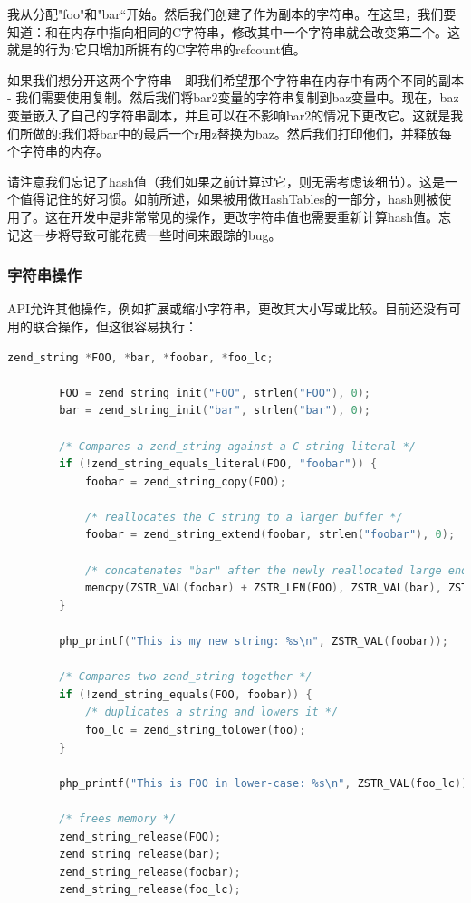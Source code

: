 我从分配"foo"和"bar“开始。然后我们创建了作为副本的字符串。在这里，我们要知道：和在内存中指向相同的C字符串，修改其中一个字符串就会改变第二个。这就是的行为:它只增加所拥有的C字符串的refcount值。

如果我们想分开这两个字符串 - 即我们希望那个字符串在内存中有两个不同的副本 - 我们需要使用复制。然后我们将bar2变量的字符串复制到baz变量中。现在，baz变量嵌入了自己的字符串副本，并且可以在不影响bar2的情况下更改它。这就是我们所做的:我们将bar中的最后一个r用z替换为baz。然后我们打印他们，并释放每个字符串的内存。

请注意我们忘记了hash值（我们如果之前计算过它，则无需考虑该细节）。这是一个值得记住的好习惯。如前所述，如果被用做HashTables的一部分，hash则被使用了。这在开发中是非常常见的操作，更改字符串值也需要重新计算hash值。忘记这一步将导致可能花费一些时间来跟踪的bug。

\subsubsection{字符串操作}

 API允许其他操作，例如扩展或缩小字符串，更改其大小写或比较。目前还没有可用的联合操作，但这很容易执行：

\begin{lstlisting}[language=c]
        zend_string *FOO, *bar, *foobar, *foo_lc;

        FOO = zend_string_init("FOO", strlen("FOO"), 0);
        bar = zend_string_init("bar", strlen("bar"), 0);
        
        /* Compares a zend_string against a C string literal */
        if (!zend_string_equals_literal(FOO, "foobar")) {
            foobar = zend_string_copy(FOO);
        
            /* reallocates the C string to a larger buffer */
            foobar = zend_string_extend(foobar, strlen("foobar"), 0);
        
            /* concatenates "bar" after the newly reallocated large enough "FOO" */
            memcpy(ZSTR_VAL(foobar) + ZSTR_LEN(FOO), ZSTR_VAL(bar), ZSTR_LEN(bar));
        }
        
        php_printf("This is my new string: %s\n", ZSTR_VAL(foobar));
        
        /* Compares two zend_string together */
        if (!zend_string_equals(FOO, foobar)) {
            /* duplicates a string and lowers it */
            foo_lc = zend_string_tolower(foo);
        }
        
        php_printf("This is FOO in lower-case: %s\n", ZSTR_VAL(foo_lc));
        
        /* frees memory */
        zend_string_release(FOO);
        zend_string_release(bar);
        zend_string_release(foobar);
        zend_string_release(foo_lc);
\end{lstlisting}  

